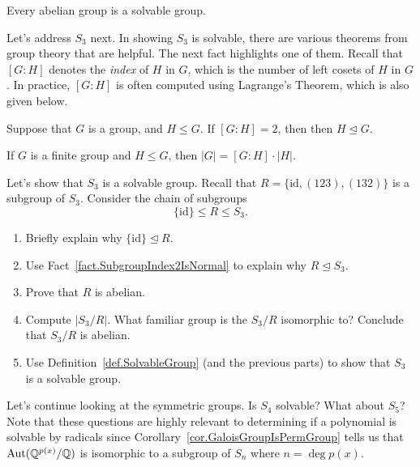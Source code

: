 \begin{theorem}
Every abelian group is a solvable group.
\end{theorem}

Let's address $S_3$ next. In showing $S_3$ is solvable, there are various theorems from group theory that are helpful. The next fact highlights one of them. Recall that $[G:H]$ denotes the \emph{index} of $H$ in $G$, which is the number of left cosets of $H$ in $G$. In practice, $[G:H]$ is often computed using Lagrange's Theorem, which is also given below. 

\begin{fact}\label{fact.SubgroupIndex2IsNormal}
Suppose that $G$ is a group, and $H\le G$. If $[G:H]=2$, then then $H\trianglelefteq G$.
\end{fact}

\begin{fact}\label{thm.Lagrange}
If $G$ is a finite group and $H\le G$, then $|G| = [G:H]\cdot|H|$.
\end{fact}

\begin{problem}
Let's show that $S_3$ is a solvable group. Recall that $R = \{\text{id},(123),(132)\}$ is a subgroup of $S_3$. Consider the chain of subgroups \[\{\text{id}\} \le R \le S_3.\]
\begin{enumerate}
\item Briefly explain why $\{\text{id}\} \trianglelefteq R$.
\item Use Fact~\ref{fact.SubgroupIndex2IsNormal} to explain why $R\trianglelefteq S_3$.
\item Prove that $R$ is abelian.
\item Compute $|S_3/R|$. What familiar group is the  $S_3/R$ isomorphic to? Conclude that $S_3/R$ is abelian.
\item Use Definition~\ref{def.SolvableGroup} (and the previous parts) to show that $S_3$ is a solvable group.
\end{enumerate}
\end{problem}

Let's continue looking at the symmetric groups. Is $S_4$ solvable? What about $S_5$? Note that these  questions are highly relevant to determining if a polynomial is solvable by radicals since Corollary~\ref{cor.GaloisGroupIsPermGroup} tells us that $\operatorname{Aut}(\mathbb{Q}^{p(x)}/\mathbb{Q})$ is isomorphic to a subgroup of $S_n$  where $n = \deg p(x)$.

